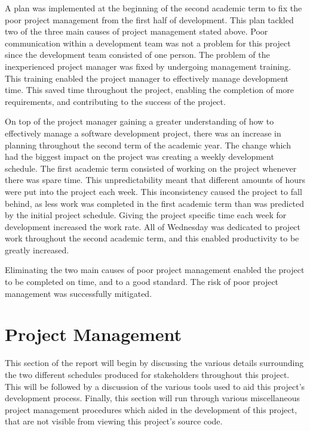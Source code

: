 \documentclass{article}
\begin{document}
A plan was implemented at the beginning of the second academic term to fix the poor project management from the first half of development. This plan tackled two of the three main causes of project management stated above. Poor communication within a development team was not a problem for this project since the development team consisted of one person. The problem of the inexperienced project manager was fixed by undergoing management training. This training enabled the project manager to effectively manage development time. This saved time throughout the project, enabling the completion of more requirements, and contributing to the success of the project. \par

On top of the project manager gaining a greater understanding of how to effectively manage a software development project, there was an increase in planning throughout the second term of the academic year. The change which had the biggest impact on the project was creating a weekly development schedule. The first academic term consisted of working on the project whenever there was spare time. This unpredictability meant that different amounts of hours were put into the project each week. This inconsistency caused the project to fall behind, as less work was completed in the first academic term than was predicted by the initial project schedule. Giving the project specific time each week for development increased the work rate. All of Wednesday was dedicated to project work throughout the second academic term, and this enabled productivity to be greatly increased. \par

Eliminating the two main causes of poor project management enabled the project to be completed on time, and to a good standard. The risk of poor project management was successfully mitigated. \par

\section{Project Management}
\label{section:projectManagement}

This section of the report will begin by discussing the various details surrounding the two different schedules produced for stakeholders throughout this project. This will be followed by a discussion of the various tools used to aid this project's development process. Finally, this section will run through various miscellaneous project management procedures which aided in the development of this project, that are not visible from viewing this project's source code. \par
\end{document}
